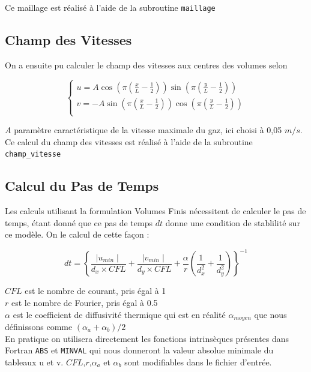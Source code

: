\documentclass[a4paper,oneside]{article}
\begin{document}
Ce maillage est réalisé à l'aide de la subroutine \verb?maillage?

\subsection{Champ des Vitesses}

On a ensuite pu calculer le champ des vitesses aux centres des volumes selon \label{eqvitesses}

\begin{equation*}
\begin{cases}
 u = A \cos \left( \pi \left( {\frac{x}{L} - \frac{1}{2}} \right) \right)  \sin \left( \pi \left( \frac{y}{L} - \frac{1}{2}\right) \right) \\
 v = -A \sin \left( \pi \left( {\frac{x}{L} - \frac{1}{2}} \right) \right)  \cos \left( \pi \left( \frac{y}{L} - \frac{1}{2}\right) \right) \\
\end{cases}
\end{equation*}

 $A$ paramètre caractéristique de la vitesse maximale du gaz, ici choisi à 0,05 $m/s$.\\

Ce calcul du champ des vitesses est réalisé à l'aide de la subroutine \verb?champ_vitesse?

\subsection{Calcul du Pas de Temps}

Les calculs utilisant la formulation Volumes Finis nécessitent de calculer le pas de temps, étant donné que ce pas de temps $dt$ donne une condition de stablilité sur ce modèle. On le calcul de cette façon :

\[
	dt =  \left\{ \frac{\mid u_{min}\mid}{d_x \times CFL} +\frac{\mid v_{min}\mid}{d_y \times CFL} + \frac{\alpha}{r}\left(\frac{1}{d_x^2} + \frac{1}{d_y^2}\right) \right\}^{-1}
\]

\noindent $CFL$ est le nombre de courant, pris égal à 1\\
$r$ est le nombre de Fourier, pris égal à 0.5\\
$\alpha$ est le coefficient de diffusivité thermique qui est en réalité $\alpha_{moyen}$ que nous définissons comme $(\alpha_a + \alpha_b)/2$\\

En pratique on utilisera directement les fonctions intrinsèques présentes dans Fortran \verb?ABS? et \verb?MINVAL? qui nous donneront la valeur absolue minimale du tableaux u et v.
$CFL$,$r$,$\alpha_a$ et $\alpha_b$ sont modifiables dans le fichier d'entrée.
\end{document}
